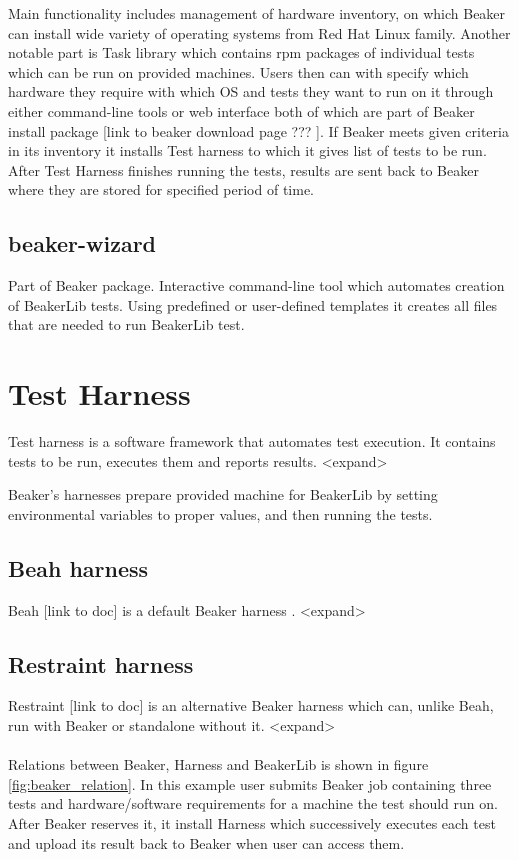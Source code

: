 Main functionality includes management of hardware inventory, on which Beaker can install wide variety  of operating systems from Red Hat Linux family. Another notable part  is Task library which contains rpm packages of individual tests which can be run on provided machines. 
Users then can with specify which hardware they require with which OS and tests they want to run on it through either command-line tools or web interface both of which are part of Beaker install package [link to beaker download page ??? ]. If Beaker meets given criteria in its inventory it installs Test harness to which it gives list of tests to be run.  After Test Harness finishes running the tests, results are sent back to Beaker where they are stored for specified period of time. 

\subsection{beaker-wizard}
Part of Beaker package. Interactive command-line tool which automates creation of BeakerLib tests. Using predefined or user-defined templates it creates all files that are needed to run BeakerLib test.

\section{Test Harness}
Test harness is a software framework that automates test execution. It contains tests to be run, executes them and reports results. <expand>

Beaker’s harnesses prepare provided machine for BeakerLib by setting environmental variables to proper values, and then running the tests.

\subsection{Beah harness}
Beah [link to doc] is a default Beaker harness . <expand> 

\subsection{Restraint harness}
Restraint [link to doc] is an alternative Beaker harness which can, unlike Beah, run with Beaker or standalone without it. <expand>
\\
\\
Relations between Beaker, Harness and BeakerLib is shown in figure \ref{fig:beaker_relation}. In this example user submits Beaker job containing three tests and hardware/software requirements for a machine the test should run on. After Beaker reserves it, it install Harness which successively executes each test and upload its result back to Beaker when user can access them.

